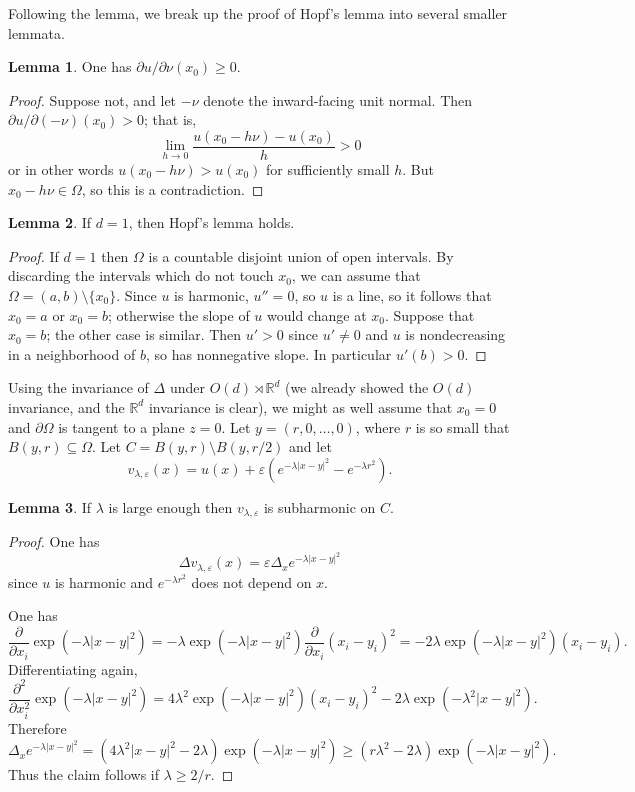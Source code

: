 \documentclass[10pt]{article}
\newcommand{\RR}{\mathbb{R}}
\theoremstyle{definition}
\newtheorem{lemma}{Lemma}[exer]
\begin{document}
Following the lemma, we break up the proof of Hopf's lemma into several smaller lemmata.

\begin{lemma}
One has $\partial u/\partial \nu (x_0) \geq 0$.
\end{lemma}
\begin{proof}
Suppose not, and let $-\nu$ denote the inward-facing unit normal. Then $\partial u/\partial(-\nu) (x_0) > 0$; that is,
$$\lim_{h \to 0} \frac{u(x_0 - h\nu) - u(x_0)}{h} > 0$$
or in other words $u(x_0 - h\nu) > u(x_0)$ for sufficiently small $h$.
But $x_0 - h\nu \in \Omega$, so this is a contradiction.
\end{proof}

\begin{lemma}
If $d = 1$, then Hopf's lemma holds.
\end{lemma}
\begin{proof}
If $d =1 $ then $\Omega$ is a countable disjoint union of open intervals.
By discarding the intervals which do not touch $x_0$, we can assume that $\Omega = (a, b) \setminus \{x_0\}$.
Since $u$ is harmonic, $u'' = 0$, so $u$ is a line, so it follows that $x_0 = a$ or $x_0 = b$; otherwise the slope of $u$ would change at $x_0$.
Suppose that $x_0 = b$; the other case is similar.
Then $u' > 0$ since $u' \neq 0$ and $u$ is nondecreasing in a neighborhood of $b$, so has nonnegative slope.
In particular $u'(b) > 0$.
\end{proof}

Using the invariance of $\Delta$ under $O(d) \rtimes \RR^d$ (we already showed the $O(d)$ invariance, and the $\RR^d$ invariance is clear), we might as well assume that $x_0 = 0$ and $\partial \Omega$ is tangent to a plane $z = 0$.
Let $y = (r, 0, \dots, 0)$, where $r$ is so small that $B(y, r) \subseteq \Omega$.
Let $C = B(y, r) \setminus B(y, r/2)$ and let
$$v_{\lambda,\varepsilon}(x) = u(x) + \varepsilon \left(e^{-\lambda|x-y|^2} - e^{-\lambda r^2} \right).$$

\begin{lemma}
If $\lambda$ is large enough then $v_{\lambda,\varepsilon}$ is subharmonic on $C$.
\end{lemma}
\begin{proof}
One has
$$\Delta v_{\lambda,\varepsilon}(x) = \varepsilon \Delta_x e^{-\lambda|x-y|^2}$$
since $u$ is harmonic and $e^{-\lambda r^2}$ does not depend on $x$.

One has
$$\frac{\partial}{\partial x_i} \exp(-\lambda |x - y|^2) = - \lambda \exp(-\lambda |x -y|^2) \frac{\partial}{\partial x_i} (x_i - y_i)^2 = -2\lambda\exp(-\lambda|x-y|^2) (x_i - y_i).$$
Differentiating again,
$$\frac{\partial^2}{\partial x_i^2} \exp(-\lambda |x - y|^2) = 4\lambda^2 \exp(-\lambda|x-y|^2)(x_i - y_i)^2 - 2\lambda \exp(-\lambda^2|x-y|^2).$$
Therefore
$$\Delta_x e^{-\lambda|x-y|^2} = (4\lambda^2|x-y|^2 - 2\lambda) \exp(-\lambda|x-y|^2) \geq (r\lambda^2 - 2\lambda) \exp(-\lambda|x-y|^2).$$
Thus the claim follows if $\lambda \geq 2/r$.
\end{proof}
\end{document}
